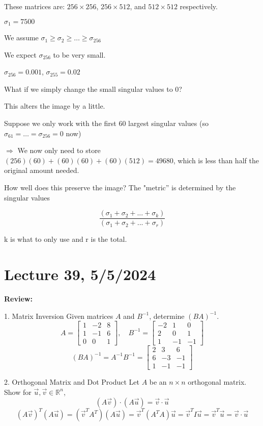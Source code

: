 \documentclass{article}
\begin{document}
These matrices are: $256 \times 256$, $256 \times 512$, and $512 \times 512$ respectively.

$\sigma_1 = 7500$

We assume $\sigma_1 \geq \sigma_2 \geq \ldots \geq \sigma_{256}$

We expect $\sigma_{256}$ to be very small.

$\sigma_{256} = 0.001$, $\sigma_{255} = 0.02$

What if we simply change the small singular values to $0$?

This alters the image by a little.

Suppose we only work with the first $60$ largest singular values (so $\sigma_{61} = \ldots = \sigma_{256} = 0$ now)

$\Rightarrow$ We now only need to store $(256)(60) + (60)(60) + (60)(512) = 49680$, which is less than half the original amount needed.



How well does this preserve the image? The "metric'' is determined by the singular values 

$$\frac{(\sigma_1+\sigma_2+...+\sigma_k)}{(\sigma_1+\sigma_2+...+\sigma_r)}$$

k is what to only use and r is the total.


\section{Lecture 39, 5/5/2024}

\textbf{Review:}

1. Matrix Inversion
Given matrices \( A \) and \( B^{-1} \), determine \( (BA)^{-1} \).
\[
A = \begin{bmatrix} 1 & -2 & 8 \\ 1 & -1 & 6 \\ 0 & 0 & 1 \end{bmatrix}, \quad
B^{-1} = \begin{bmatrix} -2 & 1 & 0 \\ 2 & 0 & 1 \\ 1 & -1 & -1 \end{bmatrix}
\]
\[
(BA)^{-1} = A^{-1}B^{-1} = \begin{bmatrix} 2 & 3 & 6 \\ 6 & -3 & -1 \\ 1 & -1 & -1 \end{bmatrix}
\]

2. Orthogonal Matrix and Dot Product
Let \( A \) be an \( n \times n \) orthogonal matrix. Show for \( \vec{u}, \vec{v} \in \mathbb{R}^n \),
\[
(A\vec{v}) \cdot (A\vec{u}) = \vec{v} \cdot \vec{u}
\]
\[
(A\vec{v})^T(A\vec{u}) = (\vec{v}^TA^T)(A\vec{u}) = \vec{v}^T(A^TA)\vec{u} = \vec{v}^TI\vec{u} = \vec{v}^T\vec{u} = \vec{v} \cdot \vec{u}
\]
\end{document}
